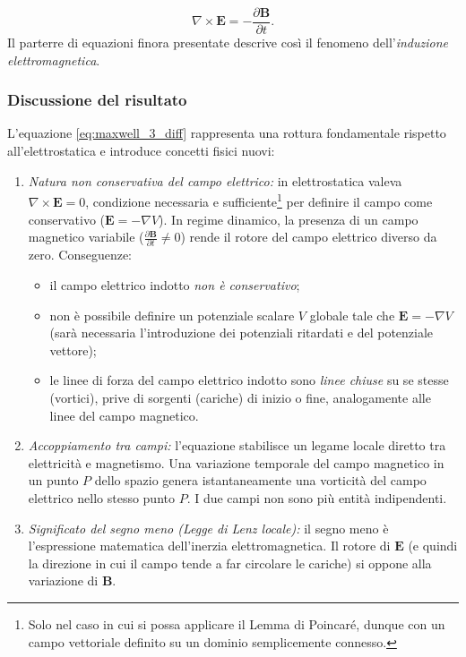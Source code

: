 \documentclass[a4paper,11pt]{report}
\begin{document}
\begin{equation}
    { \nabla \times \bm{E} = -\frac{\partial \bm{B}}{\partial t} }.
    \label{eq:maxwell_3_diff}
\end{equation}
Il parterre di equazioni finora presentate descrive così il fenomeno dell'\textit{induzione elettromagnetica}.

\subsubsection{Discussione del risultato}
L'equazione \eqref{eq:maxwell_3_diff} rappresenta una rottura fondamentale rispetto all'elettrostatica e introduce concetti fisici nuovi:

\begin{enumerate}
    \item \textit{Natura non conservativa del campo elettrico:}
    in elettrostatica valeva $\nabla \times \bm{E} = 0$, condizione necessaria e sufficiente\footnote{Solo nel caso in cui si possa applicare il Lemma di Poincaré, dunque con un campo vettoriale definito su un dominio semplicemente connesso.} per definire il campo come conservativo ($\bm{E} = -\nabla V$).
    In regime dinamico, la presenza di un campo magnetico variabile ($\frac{\partial \bm{B}}{\partial t} \neq 0$) rende il rotore del campo elettrico diverso da zero.
    {Conseguenze:}
    \begin{itemize}
        \item il campo elettrico indotto \textit{non è conservativo};
        \item non è possibile definire un potenziale scalare $V$ globale tale che $\bm{E} = -\nabla V$ (sarà necessaria l'introduzione dei potenziali ritardati e del potenziale vettore);
        \item le linee di forza del campo elettrico indotto sono \textit{linee chiuse} su se stesse (vortici), prive di sorgenti (cariche) di inizio o fine, analogamente alle linee del campo magnetico.
    \end{itemize}

    \item \textit{Accoppiamento tra campi:}
    l'equazione stabilisce un legame locale diretto tra elettricità e magnetismo. Una variazione temporale del campo magnetico in un punto $P$ dello spazio genera istantaneamente una vorticità del campo elettrico nello stesso punto $P$. I due campi non sono più entità indipendenti.

    \item \textit{Significato del segno meno (Legge di Lenz locale):}
    il segno meno è l'espressione matematica dell'inerzia elettromagnetica. Il rotore di $\bm{E}$ (e quindi la direzione in cui il campo tende a far circolare le cariche) si oppone alla variazione di $\bm{B}$. 
    

\end{enumerate}
\end{document}
